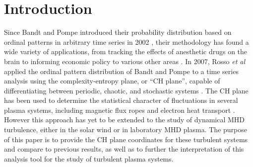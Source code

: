 \documentclass[aps,prx,twocolumn,secnumarabic,nobalancelastpage,amsmath,amssymb,
nofootinbib]{revtex4-1}
\begin{document}
\section{Introduction}
Since Bandt and Pompe introduced their probability distribution based on ordinal patterns in arbitrary time series in 2002 \cite{bandt2002}, their methodology has found a wide variety of applications, from tracking the effects of anesthetic drugs on the brain \cite{li2010,jordan2008,olofsen2008} to informing economic policy \cite{bariviera2013,zunino2010,zunino2011} to various other areas \cite{kowalski2007,soriano2011,saco2010,suyal2012,sun2010}. In 2007, Rosso \textit{et al} applied the ordinal pattern distribution of Bandt and Pompe to a time series analysis using the complexity-entropy plane, or ``CH plane'', capable of differentiating between periodic, chaotic, and stochastic systems \cite{rosso2007}. The CH plane has been used to determine the statistical character of fluctuations in several plasma systems, including magnetic flux ropes \cite{gekelman2014} and electron heat transport \cite{maggs2013}. However this approach has yet to be extended to the study of dynamical MHD turbulence, either in the solar wind or in laboratory MHD plasma. The purpose of this paper is to provide the CH plane coordinates for these turbulent systems and compare to previous results, as well as to further the interpretation of this analysis tool for the study of turbulent plasma systems.
\end{document}

